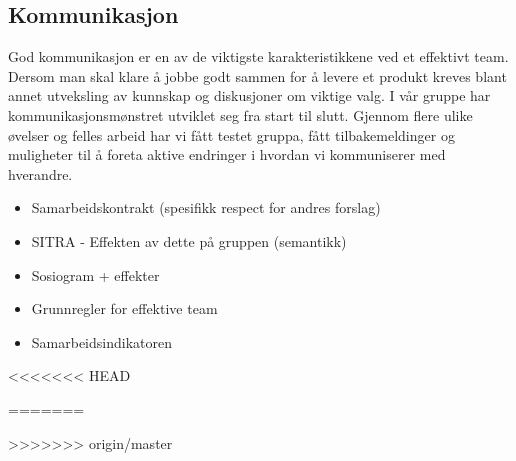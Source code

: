 \subsection{Kommunikasjon}


God kommunikasjon er en av de viktigste karakteristikkene ved et effektivt team.
Dersom man skal klare å jobbe godt sammen for å levere et produkt kreves blant annet utveksling av kunnskap og diskusjoner om viktige valg.
I vår gruppe har kommunikasjonsmønstret utviklet seg fra start til slutt.
Gjennom flere ulike øvelser og felles arbeid har vi fått testet gruppa, fått tilbakemeldinger og muligheter til å foreta aktive endringer i hvordan vi kommuniserer med hverandre.

\begin{itemize}
\item Samarbeidskontrakt (spesifikk respect for andres forslag)
\item SITRA - Effekten av dette på gruppen (semantikk)
\item Sosiogram + effekter
\item Grunnregler for effektive team
\item Samarbeidsindikatoren
\end{itemize}


%
%
<<<<<<< HEAD
%

=======


>>>>>>> origin/master

